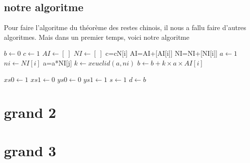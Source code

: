 \documentclass[a4paper, 11pt]{article}
\begin{document}
\subsection{notre algoritme}
Pour faire l'algoritme du théorème des restes chinois, il nous a fallu faire d'autres algoritmes. Mais dans un premier temps, voici notre algoritme
\newline
\begin{algorithm}
    $ b \leftarrow 0$ \;
    $ c \leftarrow 1$ \;
    $ AI \leftarrow [ \:]$ \;
    $ NI \leftarrow [ \:]$ \;
    {   
        {c=c\times N[i]}
        {
            AI=AI+[AI[i]] \newline
            NI=NI+[NI[i]]
        }
    }
    {
        $a \leftarrow 1 $ \;
        $ni \leftarrow NI[i]$ \;
        {
                { a=a*NI[j]}
        $k \leftarrow xeuclid(a,ni) $ \;
        $b \leftarrow b+k\times a\times AI[i] $ \; 
        }
    }
\end{algorithm}

\begin{algorithm}
    $xs0 \leftarrow 1 $ \;
    $xs1 \leftarrow 0 $ \;
    $ys0 \leftarrow 0 $ \;
    $ys1 \leftarrow 1 $ \;
    $s \leftarrow 1 $ \;
    $d \leftarrow b $ \;
\end{algorithm}

\newpage
\section{grand 2}

\newpage
\section{grand 3}
\end{document}
